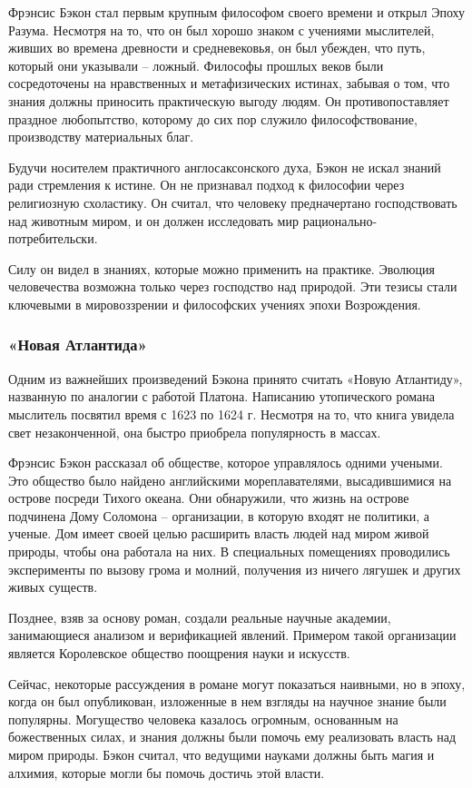 \documentclass[a4paper, 14pt]{extreport}
\begin{document}
Фрэнсис Бэкон стал первым крупным философом своего времени и открыл
Эпоху Разума. Несмотря на то, что он был хорошо знаком с учениями
мыслителей, живших во времена древности и средневековья, он был убежден,
что путь, который они указывали -- ложный. Философы прошлых веков были
сосредоточены на нравственных и метафизических истинах, забывая о том,
что знания должны приносить практическую выгоду людям. Он
противопоставляет праздное любопытство, которому до сих пор служило
философствование, производству материальных благ.

Будучи носителем практичного англосаксонского духа, Бэкон не искал
знаний ради стремления к истине. Он не признавал подход к философии
через религиозную схоластику. Он считал, что человеку предначертано
господствовать над животным миром, и он должен исследовать мир
рационально-потребительски.

Силу он видел в знаниях, которые можно применить на практике. Эволюция
человечества возможна только через господство над природой. Эти тезисы
стали ключевыми в мировоззрении и философских учениях эпохи Возрождения.

\subsubsection{«Новая Атлантида»}

Одним из важнейших произведений Бэкона принято считать «Новую
Атлантиду», названную по аналогии с работой Платона. Написанию
утопического романа мыслитель посвятил время с 1623 по 1624 г. Несмотря
на то, что книга увидела свет незаконченной, она быстро приобрела
популярность в массах.

Фрэнсис Бэкон рассказал об обществе, которое управлялось одними учеными.
Это общество было найдено английскими мореплавателями, высадившимися на
острове посреди Тихого океана. Они обнаружили, что жизнь на острове
подчинена Дому Соломона -- организации, в которую входят не политики, а
ученые. Дом имеет своей целью расширить власть людей над миром живой
природы, чтобы она работала на них. В специальных помещениях проводились
эксперименты по вызову грома и молний, получения из ничего лягушек и
других живых существ.

Позднее, взяв за основу роман, создали реальные научные академии,
занимающиеся анализом и верификацией явлений. Примером такой организации
является Королевское общество поощрения науки и искусств.

Сейчас, некоторые рассуждения в романе могут показаться наивными, но в
эпоху, когда он был опубликован, изложенные в нем взгляды на научное
знание были популярны. Могущество человека казалось огромным, основанным
на божественных силах, и знания должны были помочь ему реализовать
власть над миром природы. Бэкон считал, что ведущими науками должны быть
магия и алхимия, которые могли бы помочь достичь этой власти.
\end{document}
